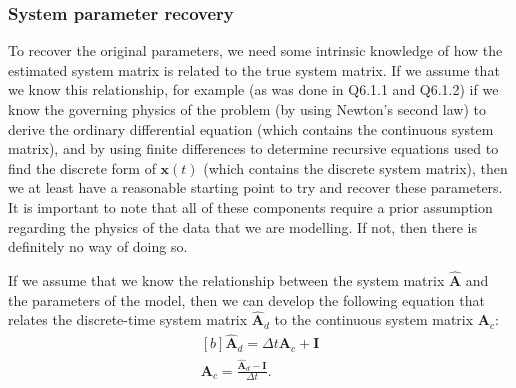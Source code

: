 \documentclass{article}
\begin{document}
\subsubsection{System parameter recovery}\label{section:unforced_parameter_recovery}

To recover the original parameters, we need some intrinsic knowledge of how the estimated system matrix is related to the true system matrix. If we assume that we know this relationship, for example (as was done in Q6.1.1 and Q6.1.2) if we know the governing physics of the problem (by using Newton's second law) to derive the ordinary differential equation (which contains the continuous system matrix), and by using finite differences to determine recursive equations used to find the discrete form of $\mathbf{x}(t)$ (which contains the discrete system matrix), then we at least have a reasonable starting point to try and recover these parameters. It is important to note that all of these components require a prior assumption regarding the physics of the data that we are modelling. If not, then there is definitely no way of doing so. 

If we assume that we know the relationship between the system matrix $\hat{\mathbf{A}}$ and the parameters of the model, then we can develop the following equation that relates the discrete-time system matrix $\hat{\mathbf{A}}_d$ to the continuous system matrix $\mathbf{A}_c$:
\begin{equation}
\begin{aligned}[b]
\hat{\mathbf{A}}_d = \Delta t \mathbf{A}_c + \mathbf{I} \\
\mathbf{A}_c = \frac{\hat{\mathbf{A}}_d - \mathbf{I}}{\Delta t}.
\end{aligned}
\end{equation}
\end{document}
